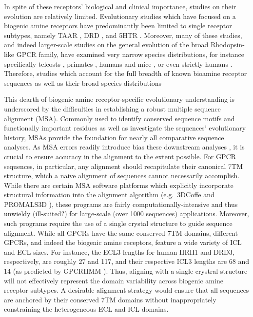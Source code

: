\documentclass[fleqn,10pt]{wlpeerj}
\begin{document}
In spite of these receptors' biological and clinical importance, studies on their evolution are relatively limited. Evolutionary studies which have focused on a biogenic amine receptors have predominantly been limited to single receptor subtypes, namely TAAR \citep{Gloriametal2005,Lindemann2005,Hashiguchi2007}, DRD \citep{Callieretal2012,Yamamotoetal2013}, and 5HTR \cite{Anbazhagan2010}. Moreover, many of these studies, and indeed larger-scale studies on the general evolution of the broad Rhodopsin-like GPCR family, have examined very narrow species distributions, for instance specifically teleosts \citep{Gloriametal2005}, primates \citep{Anbazhagan2010}, humans and mice \citep{Vassilatis2003,KakaralaJamil2014}, or even strictly humans \cite{Fredrikssonetal2003}. Therefore, studies which account for the full breadth of known bioamine receptor sequences as well as their broad species distributions 

This dearth of biogenic amine receptor-specific evolutionary understanding is underscored by the difficulties in establishing a robust multiple sequence alignment (MSA). Commonly used to identify conserved sequence motifs and functionally important residues as well as investigate the sequences' evolutionary history, MSAs provide the foundation for nearly all comparative sequence analyses. As MSA errors readily introduce bias these downstream analyses \citep{Ogden2006, Wong2008, Jordan2012}, it is crucial to ensure accuracy in the alignment to the extent possible. For GPCR sequences, in particular, any alignment should recapitulate their canonical 7TM structure, which a naive alignment of sequences cannot necessarily accomplish. While there are certain MSA software platforms which explicitly incorporate structural information into the alignment algorithm (e.g.\ 3DCoffe \citep{3dcoffee} and PROMALS3D \citep{promals3d}), these programs are fairly computationally-intensive and thus unwieldy (ill-suited?) for large-scale (over 1000 sequences) applications. Moreover, such programs require the use of a single crystal structure to guide sequence alignment. While all GPCRs have the same conserved 7TM domains, different GPCRs, and indeed the biogenic amine receptors, feature a wide variety of ICL and ECL sizes. For instance, the ECL3 lengths for human HRH1 and DRD3, respectively, are roughly 27 and 117, and their respective ICL3 lengths are 68 and 14 (as predicted by GPCRHMM \citep{Wistrand2006}). Thus, aligning with a single crystral structure will not effectively represent the domain variability across biogenic amine receptor subtypes. A desirable alignment strategy would ensure that all sequences are anchored by their conserved 7TM domains without inappropriately constraining the heterogeneous ECL and ICL domains.
\end{document}
